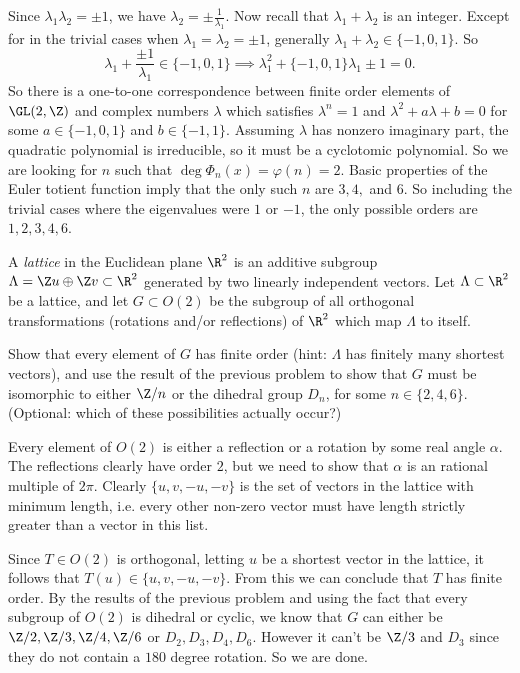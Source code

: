 \documentclass[11pt,letterpaper]{article}
\begin{document}
Since $\lambda_1\lambda_2=\pm 1$, we have $\lambda_2=\pm\frac{1}{\lambda_1}$. Now recall that $\lambda_1+\lambda_2$ is an integer. Except for in the trivial cases when $\lambda_1=\lambda_2=\pm 1$, generally $\lambda_1+\lambda_2\in \{ -1, 0, 1\}$. So
\[
  \lambda_1+\frac{\pm 1}{\lambda_1}\in \{-1,0,1\} \implies \lambda_1^2+\{-1,0,1\}\lambda_1\pm 1=0 
.\]
So there is a one-to-one correspondence between finite order elements of $\GL(2,\Z)$ and complex numbers $\lambda$ which satisfies $\lambda^n=1$ and $\lambda^2+a\lambda+b=0$ for some $a\in \{-1,0,1\}$ and $b\in \{-1,1\}$. Assuming $\lambda$ has nonzero imaginary part, the quadratic polynomial is irreducible, so it must be a cyclotomic polynomial. So we are looking for $n$ such that $\deg \Phi_n(x)=\varphi(n)=2$. Basic properties of the Euler totient function imply that the only such $n$ are $3,4,$ and $6$. So including the trivial cases where the eigenvalues were $1$ or $-1$, the only possible orders are $1,2,3,4,6$.     

\pagebreak
\begin{problem}
A {\em lattice} in the Euclidean plane $\R^2$ is an additive subgroup $\Lambda=\Z u\oplus \Z v\subset \R^2$ generated by two linearly independent vectors. Let $\Lambda\subset \R^2$ be a lattice, and let $G\subset O(2)$ be the subgroup of all orthogonal transformations (rotations and/or reflections) of $\R^2$ which map $\Lambda$ to itself.

\medskip
Show that every element of $G$ has finite order (hint: $\Lambda$ has finitely many shortest vectors), and use the result of the previous problem to show that $G$ must be isomorphic to either $\Z/n$ or the dihedral group $D_n$, for some $n\in \{2,4,6\}$. (Optional: which of these possibilities actually occur?)
\end{problem}

Every element of $O(2)$ is either a reflection or a rotation by some real angle $\alpha$. The reflections clearly have order $2$, but we need to show that $\alpha$ is an rational multiple of $2\pi$. Clearly $\{u,v,-u,-v\}$ is the set of vectors in the lattice with minimum length, i.e. every other non-zero vector must have length strictly greater than a vector in this list.      

Since $T\in O(2)$ is orthogonal, letting $u$ be a shortest vector in the lattice, it follows that $T(u)\in \{u, v, -u, -v\}$. From this we can conclude that $T$ has finite order. By the results of the previous problem and using the fact that every subgroup of $O(2)$ is dihedral or cyclic, we know that $G$ can either be $\Z/2, \Z/3, \Z/4, \Z/6$ or $D_2, D_3, D_4, D_6$. However it can't be $\Z/3$ and $D_3$ since they do not contain a $180$ degree rotation. So we are done.           
\end{document}
